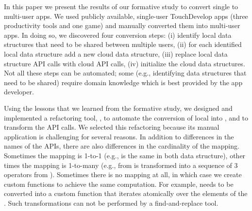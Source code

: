\documentclass{sigplanconf}
\begin{document}
In this paper we present the results of our formative study to convert single to multi-user apps. We used \numFormative publicly available, single-user TouchDevelop apps (three productivity tools and one game) and manually converted them into multi-user apps. In doing so, we discovered four conversion steps: (i) identify local data structures that need to be shared between multiple users, (ii) for each identified local data structure add a new cloud data structure, (iii) replace local data structure API calls with cloud API calls, (iv) initialize the cloud data structures. Not all these steps can be automated; some (e.g., identifying data structures that need to be shared) require domain knowledge which is best provided by the app developer. 

Using the lessons that we learned from the formative study, we designed and implemented a refactoring tool, \tool, to automate the conversion of local \NC{} into , and to transform the API calls. We selected this refactoring because its manual application is 
challenging for several reasons.
In addition to differences in the names of the APIs, there are also differences in the cardinality of the mapping.
Sometimes the mapping is 1-to-1 (e.g.,  is the same in both data structure), other times the mapping is 1-to-many (e.g.,  from  is transformed into a sequence of 3 operators from ). Sometimes there is no mapping at all, in which case we create custom functions to achieve the same computation. For example,  needs to be converted into a custom function that iterates atomically over the elements of the . Such transformations can not be performed by a find-and-replace tool.
\end{document}
